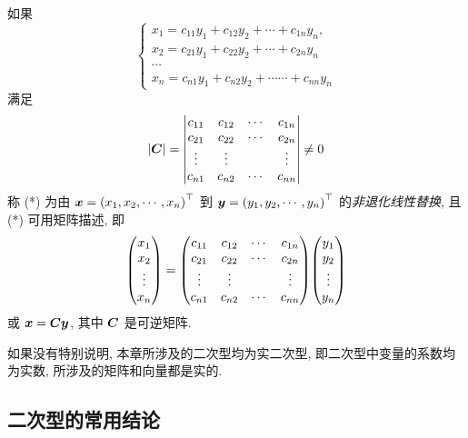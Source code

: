 \begin{definition}[非线性替换]
    如果
    \begin{equation}
        \left\{\begin{array}{l}
            x_{1}=c_{11} y_{1}+c_{12} y_{2}+\cdots+c_{1 n} y_{n}, \\
            x_{2}=c_{21} y_{1}+c_{22} y_{2}+\cdots+c_{2 n} y_{n}  \\
            \cdots                                                \\
            x_{n}=c_{n 1} y_{1}+c_{n 2} y_{2}+\cdots \cdots+c_{n n} y_{n}
        \end{array}\right.
        \tag{*}
    \end{equation}
    满足 $$|\vb*{C}|=\mqty|c_{11}  & c_{12}  & \cdots & c_{1 n} \\
            c_{21}  & c_{22}  & \cdots & c_{2 n} \\
            \vdots  & \vdots  &        & \vdots  \\
            c_{n 1} & c_{n 2} & \cdots & c_{n n}| \neq 0$$
    称 (*) 为由 $ \vb*{x}=\left(x_{1}, x_{2}, \cdots, x_{n}\right)^{\top} $ 到 $ \vb*{y}=\left(y_{1}, y_{2}, \cdots, y_{n}\right)^{\top} $ 的\textit{非退化线性替换}, 且 (*) 可用矩阵描述, 即
    $$\mqty( x_{1}  \\
                x_{2}  \\
                \vdots \\
                x_{n})=\mqty(c_{11}  & c_{12}  & \cdots & c_{1 n} \\
                c_{21}  & c_{22}  & \cdots & c_{2 n} \\
                \vdots  & \vdots  &        & \vdots  \\
                c_{n 1} & c_{n 2} & \cdots & c_{n n})
                \mqty(y_{1}  \\
                y_{2}  \\
                \vdots \\
                y_{n})$$
    或 $ \vb*{x}=\vb*{C y} $, 其中 $ \vb*{C} $ 是可逆矩阵.
\end{definition}

如果没有特别说明, 本章所涉及的二次型均为实二次型, 即二次型中变量的系数均为实数, 所涉及的矩阵和向量都是实的.

\subsection{二次型的常用结论}

